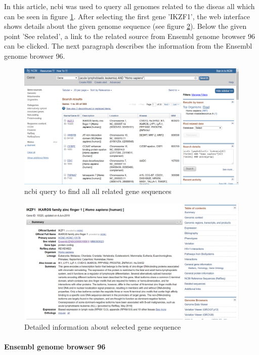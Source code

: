 In this article, \ac{ncbi} was used to query all genomes related to the diseas \ac{all} which can be seen in figure \ref{ncbi_query}.
After selecting the first gene 'IKZF1', the web interface shows details about the given genome sequence (see figure \ref{gene_details}). Below the given point 'See related', a link to the related source from Ensembl genome browser 96 can be clicked. The next paragraph describes the information from the Ensembl genome browser 96.

\begin{figure}[htbp]
	\centering
	\includegraphics[width=1\textwidth]{Image/ncbi_all_result.png}
	\caption{\ac{ncbi} query to find all \ac{all} related gene sequences}
	\label{ncbi_query}
\end{figure}

\begin{figure}[htbp]
	\centering
	\includegraphics[width=1\textwidth]{Image/ncbi_gene_details.png}
	\caption{Detailed information about selected gene sequence}
	\label{gene_details}
\end{figure}

\paragraph{Ensembl genome browser 96}

